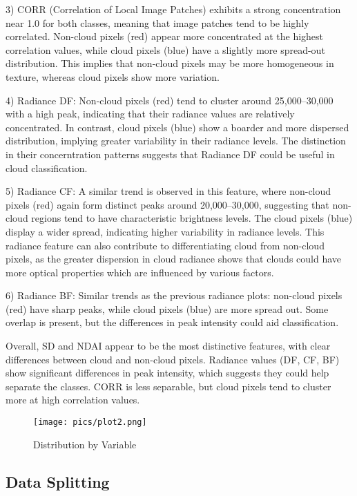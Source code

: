 \documentclass[10pt,letterpaper]{article}
\begin{document}
3) CORR (Correlation of Local Image Patches) exhibits a strong concentration near 1.0 for both classes, meaning that image patches tend to be highly correlated. Non-cloud pixels (red) appear more concentrated at the highest correlation values, while cloud pixels (blue) have a slightly more spread-out distribution. This implies that non-cloud pixels may be more homogeneous in texture, whereas cloud pixels show more variation.

4) Radiance DF: Non-cloud pixels (red) tend to cluster around 25,000–30,000 with a high peak, indicating that their radiance values are relatively concentrated. In contrast, cloud pixels (blue) show a boarder and more dispersed distribution, implying greater variability in their radiance levels. The distinction in their concerntration patterns suggests that Radiance DF could be useful in cloud classification.

5) Radiance CF: A similar trend is observed in this feature, where non-cloud pixels (red) again form distinct peaks around 20,000–30,000, suggesting that non-cloud regions tend to have characteristic brightness levels. The cloud pixels (blue) display a wider spread, indicating higher variability in radiance levels. This radiance feature can also contribute to differentiating cloud from non-cloud pixels, as the greater dispersion in cloud radiance shows that clouds could have more optical properties which are influenced by various factors.

6) Radiance BF: Similar trends as the previous radiance plots: non-cloud pixels (red) have sharp peaks, while cloud pixels (blue) are more spread out. Some overlap is present, but the differences in peak intensity could aid classification.

Overall, SD and NDAI appear to be the most distinctive features, with clear differences between cloud and non-cloud pixels. Radiance values (DF, CF, BF) show significant differences in peak intensity, which suggests they could help separate the classes. CORR is less separable, but cloud pixels tend to cluster more at high correlation values.

\begin{figure}[htbp]
    \centering
    \texttt{[image: pics/plot2.png]}  
    \caption{Distribution by Variable}
    \label{fig:plot2}
\end{figure}

\subsection{Data Splitting}
\end{document}
